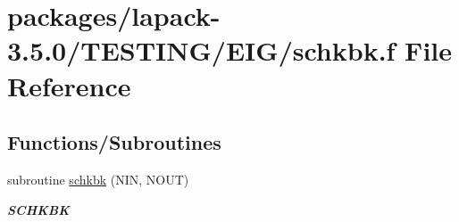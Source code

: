 \hypertarget{schkbk_8f}{}\section{packages/lapack-\/3.5.0/\+T\+E\+S\+T\+I\+N\+G/\+E\+I\+G/schkbk.f File Reference}
\label{schkbk_8f}
\subsection*{Functions/\+Subroutines}
\begin{DoxyCompactItemize}
\item 
subroutine \hyperlink{group__single__eig_gaf2b54e7c6663d08f2287b4d8227e53bf}{schkbk} (N\+I\+N, N\+O\+U\+T)
\begin{DoxyCompactList}\small\item\em {\bfseries S\+C\+H\+K\+B\+K} \end{DoxyCompactList}\end{DoxyCompactItemize}
